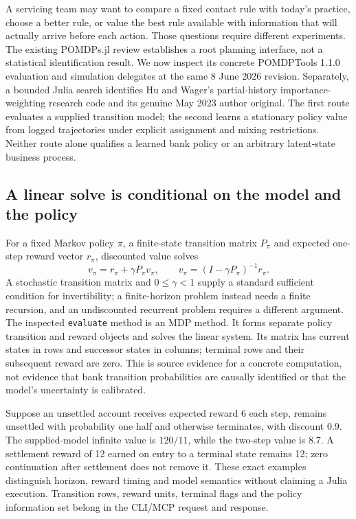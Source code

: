 A servicing team may want to compare a fixed contact rule with today's practice,
choose a better rule, or value the best rule available with information that
will actually arrive before each action. Those questions require different
experiments. The existing POMDPs.jl review establishes a root planning interface,
not a statistical identification result. We now inspect its concrete
POMDPTools 1.1.0 evaluation and simulation delegates at the same 8 June 2026
revision. Separately, a bounded Julia search identifies Hu and Wager's
partial-history importance-weighting research code and its genuine May 2023
author original. The first route evaluates a supplied transition model; the
second learns a stationary policy value from logged trajectories under explicit
assignment and mixing restrictions. Neither route alone qualifies a learned
bank policy or an arbitrary latent-state business process.
\citep{exec23_pomdpsjl_sources,exec24_policyother_tools,exec24_policyother_ope,exec24_policyother_original}

\subsection{A linear solve is conditional on the model and the policy}
For a fixed Markov policy $\pi$, a finite-state transition matrix $P_\pi$ and
expected one-step reward vector $r_\pi$, discounted value solves
\[
 v_\pi=r_\pi+\gamma P_\pi v_\pi,
 \qquad v_\pi=(I-\gamma P_\pi)^{-1}r_\pi.
\]
A stochastic transition matrix and $0\leq\gamma<1$ supply a standard sufficient
condition for invertibility; a finite-horizon problem instead needs a finite
recursion, and an undiscounted recurrent problem requires a different
argument. The inspected \texttt{evaluate} method is an MDP method. It forms
separate policy transition and reward objects and solves the linear system.
Its matrix has current states in rows and successor states in columns;
terminal rows and their subsequent reward are zero. This is source evidence
for a concrete computation, not evidence that bank transition probabilities
are causally identified or that the model's uncertainty is calibrated.
\citep{exec24_policyother_tools}

Suppose an unsettled account receives expected reward 6 each step, remains
unsettled with probability one half and otherwise terminates, with discount
0.9. The supplied-model infinite value is $120/11$, while the two-step value
is 8.7. A settlement reward of 12 earned on entry to a terminal state remains
12; zero continuation after settlement does not remove it. These exact
examples distinguish horizon, reward timing and model semantics without
claiming a Julia execution. Transition rows, reward units, terminal flags and
the policy information set belong in the CLI/MCP request and response.
\citep{exec24_policyother_contract}

